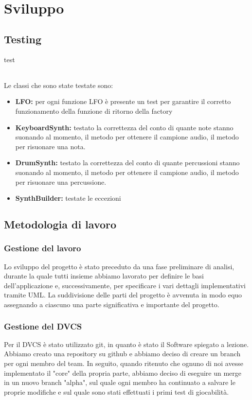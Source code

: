 \documentclass[a4paper,12pt]{report}
\begin{document}
\chapter{Sviluppo}
\section{Testing}
test \\ \\
{
Le classi che sono state testate sono: \\
\begin{itemize}
	\item \textbf{LFO:} per ogni funzione LFO è presente un test per garantire il corretto funzionamento della funzione di ritorno della factory
	
	\item \textbf{KeyboardSynth:} testato la correttezza del conto di quante note stanno suonando al momento, il metodo per ottenere il campione audio, il metodo per risuonare una nota.
	
	\item \textbf{DrumSynth:} testato la correttezza del conto di quante percussioni stanno suonando al momento, il metodo per ottenere il campione audio, il metodo per risuonare una percussione.
	
	\item \textbf{SynthBuilder:} testate le eccezioni
\end{itemize}
}
\newpage
\section{Metodologia di lavoro}
\subsection{Gestione del lavoro}
Lo sviluppo del progetto è stato preceduto da una fase preliminare di analisi, durante la quale tutti insieme abbiamo lavorato per definire le basi dell'applicazione e, successivamente, per specificare i vari dettagli implementativi tramite UML.
La suddivisione delle parti del progetto è avvenuta in modo equo assegnando a ciascuno una parte significativa e importante del progetto.
\subsection*{Gestione del DVCS}
Per il DVCS è stato utilizzato git, in quanto è stato il Software spiegato a lezione. Abbiamo creato una repository su github e abbiamo deciso di creare un branch per ogni membro del team. In seguito, quando ritenuto che ognuno di noi avesse implementato il "core" della propria parte, abbiamo deciso di eseguire un merge in un nuovo branch "alpha", sul quale ogni membro ha continuato a salvare le proprie modifiche e sul quale sono stati effettuati i primi test di giocabilità.
\newpage
\end{document}
